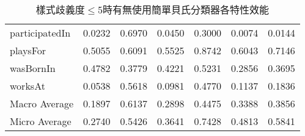 \begin{table}[htbp]
\begin{tabular}{|l||c|c|c||c|c|c|}
participatedIn & 0.0232 & 0.6970 & 0.0450 & 0.3000 & 0.0074 & 0.0144 \\
playsFor & 0.5055 & 0.6091 & 0.5525 & 0.8742 & 0.6043 & 0.7146 \\
wasBornIn & 0.4782 & 0.3779 & 0.4221 & 0.5231 & 0.2856 & 0.3695 \\
worksAt & 0.0538 & 0.5618 & 0.0981 & 0.4770 & 0.1137 & 0.1836 \\
\hline
Macro Average & 0.1897 & 0.6137 & 0.2898 & 0.4475 & 0.3388 & 0.3856 \\
Micro Average & 0.2740 & 0.5426 & 0.3641 & 0.7428 & 0.4813 & 0.5841 \\
\hline
\end{tabular}
\caption{樣式歧義度$\leq$5時有無使用簡單貝氏分類器各特性效能}
\label{t:nbc}
\end{table}

